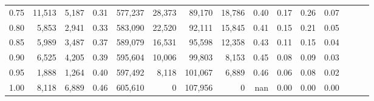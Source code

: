 \begin{tabular}{rrrrrrrrrrrrrrr}
0.75 &  11,513 &   5,187 &  0.31 &  577,237 &   28,373 &   89,170 &   18,786 &  0.40 &  0.17 &  0.26 &      0.07 \\
0.80 &   5,853 &   2,941 &  0.33 &  583,090 &   22,520 &   92,111 &   15,845 &  0.41 &  0.15 &  0.21 &      0.05 \\
0.85 &   5,989 &   3,487 &  0.37 &  589,079 &   16,531 &   95,598 &   12,358 &  0.43 &  0.11 &  0.15 &      0.04 \\
0.90 &   6,525 &   4,205 &  0.39 &  595,604 &   10,006 &   99,803 &    8,153 &  0.45 &  0.08 &  0.09 &      0.03 \\
0.95 &   1,888 &   1,264 &  0.40 &  597,492 &    8,118 &  101,067 &    6,889 &  0.46 &  0.06 &  0.08 &      0.02 \\
1.00 &   8,118 &   6,889 &  0.46 &  605,610 &        0 &  107,956 &        0 &   nan &  0.00 &  0.00 &      0.00 \\
\bottomrule
\end{tabular}
